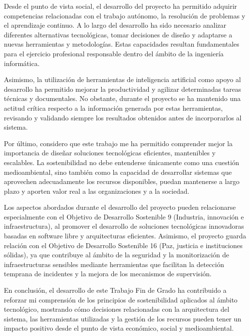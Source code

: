 Desde el punto de vista social, el desarrollo del proyecto ha permitido adquirir competencias relacionadas con el trabajo autónomo, la resolución de problemas y el aprendizaje continuo. A lo largo del desarrollo ha sido necesario analizar diferentes alternativas tecnológicas, tomar decisiones de diseño y adaptarse a nuevas herramientas y metodologías. Estas capacidades resultan fundamentales para el ejercicio profesional responsable dentro del ámbito de la ingeniería informática.

Asimismo, la utilización de herramientas de inteligencia artificial como apoyo al desarrollo ha permitido mejorar la productividad y agilizar determinadas tareas técnicas y documentales. No obstante, durante el proyecto se ha mantenido una actitud crítica respecto a la información generada por estas herramientas, revisando y validando siempre los resultados obtenidos antes de incorporarlos al sistema.

Por último, considero que este trabajo me ha permitido comprender mejor la importancia de diseñar soluciones tecnológicas eficientes, mantenibles y escalables. La sostenibilidad no debe entenderse únicamente como una cuestión medioambiental, sino también como la capacidad de desarrollar sistemas que aprovechen adecuadamente los recursos disponibles, puedan mantenerse a largo plazo y aporten valor real a las organizaciones y a la sociedad.

Los aspectos abordados durante el desarrollo del proyecto pueden relacionarse especialmente con el Objetivo de Desarrollo Sostenible 9 (Industria, innovación e infraestructura), al promover el desarrollo de soluciones tecnológicas innovadoras basadas en software libre y arquitecturas eficientes. Asimismo, el proyecto guarda relación con el Objetivo de Desarrollo Sostenible 16 (Paz, justicia e instituciones sólidas), ya que contribuye al ámbito de la seguridad y la monitorización de infraestructuras sensibles mediante herramientas que facilitan la detección temprana de incidentes y la mejora de los mecanismos de supervisión.

En conclusión, el desarrollo de este Trabajo Fin de Grado ha contribuido a reforzar mi comprensión de los principios de sostenibilidad aplicados al ámbito tecnológico, mostrando cómo decisiones relacionadas con la arquitectura del sistema, las herramientas utilizadas y la gestión de los recursos pueden tener un impacto positivo desde el punto de vista económico, social y medioambiental.